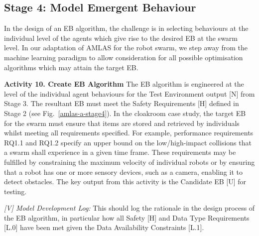 \documentclass[runningheads]{llncs}
\begin{document}
\subsection{Stage 4: Model Emergent Behaviour} \label{framework-stage4}
In the design of an EB algorithm, the challenge is in selecting behaviours at the individual level of the agents which give rise to the desired EB at the swarm level. 
In our adaptation of AMLAS for the robot swarm,  we step away from the machine learning paradigm to allow consideration for all possible optimisation algorithms which may attain the target EB.

\noindent\textbf{Activity 10. Create EB Algorithm} The EB algorithm is engineered at the level of the individual agent behaviours for the Test Environment output [N] from Stage 3. The resultant EB must meet the Safety Requirements [H] defined in Stage 2 (see Fig.~\ref{amlas-a-stage4}). 
In the cloakroom case study, the target EB for the swarm must ensure that items are stored and retrieved by individuals whilst meeting all requirements specified. For example, performance requirements RQ1.1 and RQ1.2 specify an upper bound on the low/high-impact collisions that a swarm shall experience in a given time frame. 
These requirements may be fulfilled by constraining the maximum velocity of individual robots or by ensuring that a robot has one or more sensory devices, such as a camera, enabling it to detect obstacles. 
The key output from this activity is the Candidate EB [U] for testing.

\emph{[V] Model Development Log:} This should log the rationale in the design process of the EB algorithm, in particular how all Safety [H] and Data Type Requirements [L.0] have been met given the Data Availability Constraints [L.1].
\end{document}
